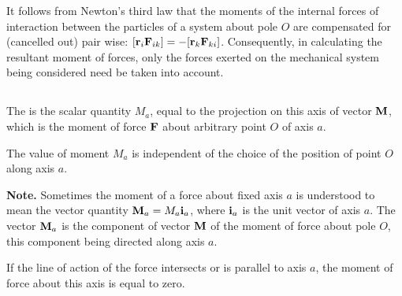 It follows from Newton's third law  that the moments of the internal forces of interaction between the particles of a system about pole $O$ are compensated for (cancelled out) pair­ wise: $\qty[\vb{r}_{i}\vb{F}_{ik}] = - \qty[\vb{r}_{k}\vb{F}_{ki}]$. Con­sequently, in calculating the resultant moment of forces, on­ly the  forces exerted on the mechanical system being considered need be taken into account.

\subsection{}\label{4.1.3} The  is the scalar quantity $M_{a}$, equal to the pro­jection on this axis of vector $\vb{M}$, which is the moment of force $\vb{F}$ about arbitrary point $O$ of axis $a$.

The value of moment $M_{a}$ is independent of the choice of the position of point $O$ along axis $a$.

\textbf{Note.} Sometimes the moment of a force about fixed axis $a$ is understood to mean the vector quantity $\vb{M}_{a} = M_{a}\vb{i}_{a}$, where $\vb{i}_{a}$ is the unit vector of axis $a$. The vector $\vb{M}_{a}$ is the compo­nent of vector $\vb{M}$ of the moment of force about pole $O$, this component being directed along axis $a$.

If the line of action of the force intersects or is parallel to axis $a$, the moment of force about this axis is equal to zero.

